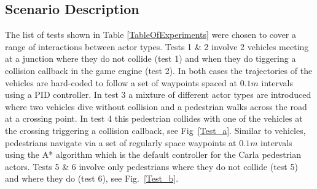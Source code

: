 \documentclass[letterpaper, 10 pt, journal, twoside]{IEEEtran}
\begin{document}



\subsection{Scenario Description}\label{TestsDescriptionAndTechnicalities}
The list of tests shown in Table \ref{TableOfExperiments} were chosen to cover a range of interactions between actor types. Tests 1 \& 2 involve 2 vehicles meeting at a junction where they do not collide (test 1) and when they do tiggering a collision callback in the game engine (test 2). In both cases the trajectories of the vehicles are hard-coded to follow a set of waypoints spaced at $0.1m$ intervals using a PID controller. In test 3 a mixture of different actor types are introduced where two vehicles dive without collision and a pedestrian walks across the road at a crossing point. In test 4 this pedestrian collides with one of the vehicles at the crossing triggering a collision callback, see Fig~\ref{Test_a}. Similar to vehicles, pedestrians navigate via a set of regularly space waypoints at $0.1m$ intervals using the A* algorithm which is the default controller for the Carla pedestrian actors. Tests 5 \& 6 involve only pedestrians where they do not collide (test 5) and where they do (test 6), see Fig.~\ref{Test_b}. 
\end{document}
